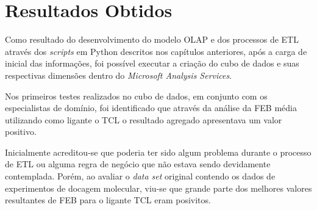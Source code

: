 \chapter{Resultados Obtidos}
\label{cap:ResultadosObtidos}

Como resultado do desenvolvimento do modelo OLAP e dos processos de ETL através dos \emph{scripts} em Python descritos nos capítulos anteriores, após a carga de inicial das informações, foi possível executar a criação do cubo de dados e suas respectivas dimensões dentro do \emph{Microsoft Analysis Services}. 

Nos primeiros testes realizados no cubo de dados, em conjunto com os especialistas de domínio, foi identificado que através da análise da FEB média utilizando como ligante o TCL o resultado agregado apresentava um valor positivo. 

Inicialmente acreditou-se que poderia ter sido algum problema durante o processo de ETL ou alguma regra de negócio que não estava sendo devidamente contemplada. Porém, ao avaliar o \emph{data set} original contendo os dados de experimentos de docagem molecular, viu-se que grande parte dos melhores valores resultantes de FEB para o ligante TCL eram posivitos.

